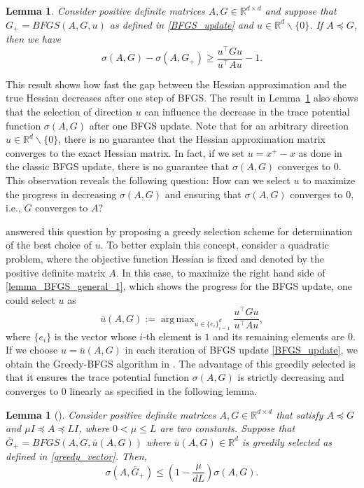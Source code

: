 \documentclass[11pt]{article}
\DeclareMathOperator*{\argmax}{arg\,max}
\numberwithin{assumption}{section}
\numberwithin{remark}{section}
\numberwithin{theorem}{section}
\newtheorem{lemma}[theorem]{Lemma}
\begin{document}
\begin{lemma}\label{lemma_BFGS_general}
Consider positive definite matrices $A, G \in \mathbb{R}^{d \times d}$ and suppose that $G_{+} = BFGS(A, G, u)$ as defined in \eqref{BFGS_update} and $u \in \mathbb{R}^d\backslash\{0\}$. If $A \preceq G$, then we have
\begin{equation}\label{lemma_BFGS_general_1}
    \sigma(A, G) - \sigma(A, G_+) \geq \frac{u^\top G u}{u^\top A u}-1.
\end{equation}
\end{lemma}

This result shows how fast the gap between the Hessian approximation and the true Hessian decreases after one step of BFGS.
The result in  Lemma~\ref{lemma_BFGS_general} also shows that the selection of direction $u$ can influence the decrease in the trace potential function $\sigma(A, G)$ after one BFGS update. Note that for an arbitrary direction $u \in \mathbb{R}^{d}\backslash\{0\}$, there is no guarantee that the Hessian approximation matrix converges to the exact Hessian matrix. In fact, if we set $u=x^+-x$ as done in the classic BFGS update, there is no guarantee that $\sigma(A, G)$ converges to $0$. This observation reveals the following question: How can we select $u$ to maximize the progress in decreasing $\sigma(A, G)$ and ensuring that $\sigma(A, G)$ converges to $0$, i.e., $G$ converges to $A$? 

\citet{rodomanov2020greedy} answered this question by proposing a greedy selection scheme for determination of the best choice of $u$. To better explain this concept, consider a quadratic problem, where the objective function Hessian is fixed and denoted by the positive definite matrix $A$. In this case, to maximize the right hand side of \eqref{lemma_BFGS_general_1}, which shows the progress for the BFGS update, one could select $u$ as
\begin{equation}\label{greedy_vector}
    \bar{u}(A, G) := \argmax_{u \in \{e_i\}_{i = 1}^{d}} \frac{u^\top G u}{u^\top A u},
\end{equation}
where $\{e_i\}$ is the vector whose $i$-th element is $1$ and its remaining elements are $0$. If we choose $u = \bar{u}(A, G)$ in each iteration of BFGS update \eqref{BFGS_update}, we obtain the Greedy-BFGS algorithm in  \cite{rodomanov2020greedy}. The advantage of this greedily selected is that it ensures the trace potential function $\sigma(A, G)$ is strictly decreasing and converges to $0$ linearly as specified in the following lemma.
\begin{lemma}[\cite{rodomanov2020greedy}]\label{lemma_BFGS_greedy}
Consider positive definite matrices $A, G \in \mathbb{R}^{d \times d}$ that satisfy $A \preceq G$ and  $ \mu I \preceq A \preceq LI$, where $0 < \mu \leq L$ are two constants. Suppose that $\bar{G}_{+} = BFGS(A, G, \bar{u}(A, G))$ where $\bar{u}(A, G) \in \mathbb{R}^d$ is  greedily selected as defined in \eqref{greedy_vector}. Then,
\begin{equation}\label{lemma_BFGS_greedy_1}
    \sigma(A, \bar{G}_{+}) \leq \left(1 - \frac{\mu}{dL}\right)\sigma(A, G).
\end{equation}
\end{lemma}
\end{document}
